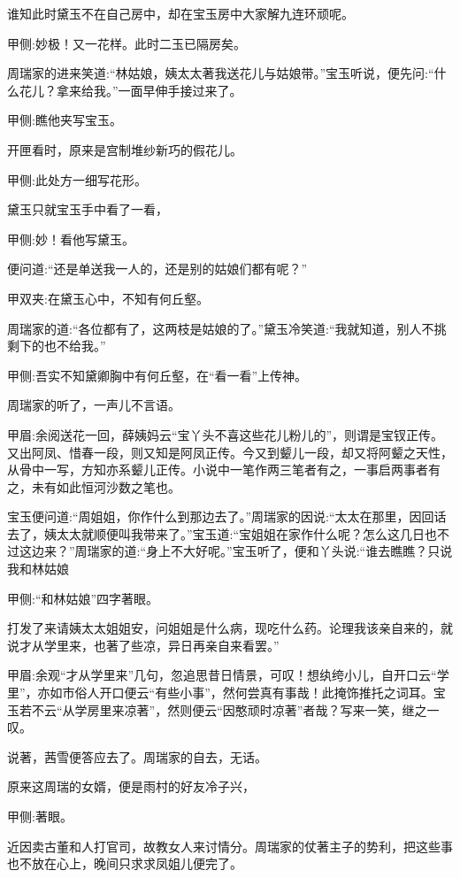 \begin{parag}
    谁知此时黛玉不在自己房中，却在宝玉房中大家解九连环顽呢。\begin{note}甲侧:妙极！又一花样。此时二玉已隔房矣。\end{note}周瑞家的进来笑道:“林姑娘，姨太太著我送花儿与姑娘带。”宝玉听说，便先问:“什么花儿？拿来给我。”一面早伸手接过来了。\begin{note}甲侧:瞧他夹写宝玉。\end{note}开匣看时，原来是宫制堆纱新巧的假花儿。\begin{note}甲侧:此处方一细写花形。\end{note}黛玉只就宝玉手中看了一看，\begin{note}甲侧:妙！看他写黛玉。\end{note}便问道:“还是单送我一人的，还是别的姑娘们都有呢？”\begin{note}甲双夹:在黛玉心中，不知有何丘壑。\end{note}周瑞家的道:“各位都有了，这两枝是姑娘的了。”黛玉冷笑道:“我就知道，别人不挑剩下的也不给我。”\begin{note}甲侧:吾实不知黛卿胸中有何丘壑，在“看一看”上传神。\end{note}周瑞家的听了，一声儿不言语。\begin{note}甲眉:余阅送花一回，薛姨妈云“宝丫头不喜这些花儿粉儿的”，则谓是宝钗正传。又出阿凤、惜春一段，则又知是阿凤正传。今又到颦儿一段，却又将阿颦之天性，从骨中一写，方知亦系颦儿正传。小说中一笔作两三笔者有之，一事启两事者有之，未有如此恒河沙数之笔也。\end{note}宝玉便问道:“周姐姐，你作什么到那边去了。”周瑞家的因说:“太太在那里，因回话去了，姨太太就顺便叫我带来了。”宝玉道:“宝姐姐在家作什么呢？怎么这几日也不过这边来？”周瑞家的道:“身上不大好呢。”宝玉听了，便和丫头说:“谁去瞧瞧？只说我和林姑娘\begin{note}甲侧:“和林姑娘”四字著眼。\end{note}打发了来请姨太太姐姐安，问姐姐是什么病，现吃什么药。论理我该亲自来的，就说才从学里来，也著了些凉，异日再亲自来看罢。”\begin{note}甲眉:余观“才从学里来”几句，忽追思昔日情景，可叹！想纨绔小儿，自开口云“学里”，亦如市俗人开口便云“有些小事”，然何尝真有事哉！此掩饰推托之词耳。宝玉若不云“从学房里来凉著”，然则便云“因憨顽时凉著”者哉？写来一笑，继之一叹。\end{note}说著，茜雪便答应去了。周瑞家的自去，无话。
\end{parag}


\begin{parag}
    原来这周瑞的女婿，便是雨村的好友冷子兴，\begin{note}甲侧:著眼。\end{note}近因卖古董和人打官司，故教女人来讨情分。周瑞家的仗著主子的势利，把这些事也不放在心上，晚间只求求凤姐儿便完了。
\end{parag}


